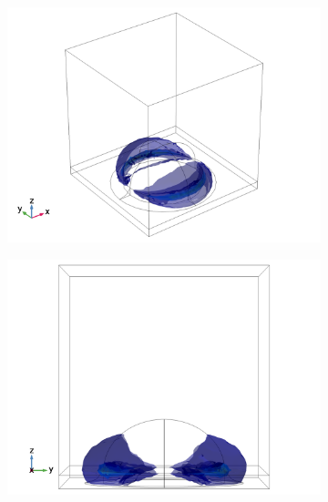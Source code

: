 \begin{figure}[h]
    \begin{subfigure}{0.32\textwidth}
        \centering
        \includegraphics[width=\linewidth, trim=0.4cm 0 1.5cm 0, clip]{figures/ch4/S6/normE/Sample6_nomE_wl585_phi0_TE.png}
        \caption{}
    \end{subfigure}
    \begin{subfigure}{0.33\textwidth}
        \centering
        \includegraphics[width=\linewidth, trim=0.6cm 0 1.6cm 0, clip]{figures/ch4/S6/normE/Sample6_nomE_wl585_phi0_TE_xtowardsviewer.png}
        \caption{}
    \end{subfigure}
    \begin{subfigure}{0.33\textwidth}

\end{subfigure}
\end{figure}
